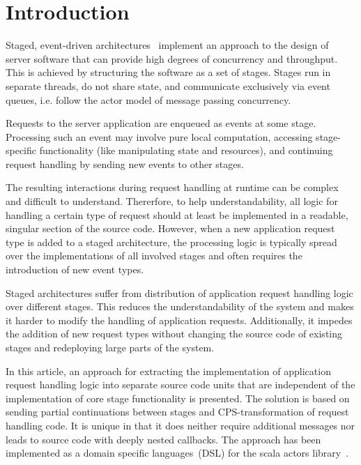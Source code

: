 \documentclass{sig-alternate}
\begin{document}


\section{Introduction}             

Staged, event-driven architectures~\cite{Welsh:2009} implement an approach to the design of
server software that can provide high degrees of concurrency and throughput. This is achieved by
structuring the software as a set of stages. Stages run in separate threads, do not share state, and
communicate exclusively via event queues, i.e. follow the actor model of message passing
concurrency.

Requests to the server application are enqueued as events at some stage. Processing such an event
may involve pure local computation, accessing stage-specific functionality (like manipulating state
and resources), and continuing request handling by sending new events to other stages.

The resulting interactions during request handling at runtime can be complex and difficult to
understand. Thererfore, to help understandability, all logic for handling a certain type of request
should at least be implemented in a readable, singular section of the source code. However, when a
new application request type is added to a staged architecture, the processing logic is typically
spread over the implementations of all involved stages and often requires the introduction of new
event types.

Staged architectures suffer from distribution of application request handling logic over different
stages. This reduces the understandability of the system and makes it harder to modify the handling
of application requests. Additionally, it impedes the addition of new request types without changing
the source code of existing stages and redeploying large parts of the system.

In this article, an approach for extracting the implementation of application request handling logic
into separate source code units that are independent of the implementation of core stage
functionality is presented. The solution is based on sending partial continuations between stages
and CPS-transformation of request handling code. It is unique in that it does neither require
additional messages nor leads to source code with deeply nested callbacks. The approach has been
implemented as a domain specific languages~(DSL) for the scala actors library~\cite{Haller:2007}.
\end{document}
